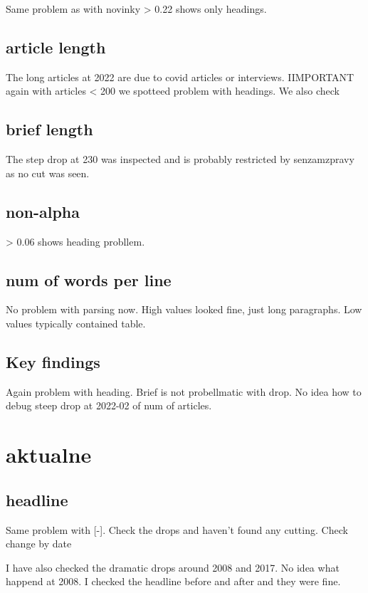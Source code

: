 \documentclass{article}
\begin{document}
        Same problem as with novinky > 0.22 shows only headings.

    \subsection{article length}
    The long articles at 2022 are due to covid articles or interviews.
    IIMPORTANT again with articles < 200 we spotteed problem with headings.
    We also check 

    \subsection{brief length}
    The step drop at 230 was inspected and is probably restricted by senzamzpravy as no cut was seen.


    \subsection{non-alpha}
    > 0.06 shows heading probllem.

    \subsection{num of words per line}
    No problem with parsing now. High values looked fine, just long paragraphs.
    Low values typically contained table.

    \subsection{Key findings}
    Again problem with heading. Brief is not probellmatic with drop.
    No idea how to debug steep drop at 2022-02 of num of articles.



    \section{aktualne}
    \subsection{headline}
     Same problem with [-]. Check the drops and haven't found any cutting.
     Check change by date 

     I have also checked the dramatic drops around 2008 and 2017.
     No idea what happend at 2008. I checked the headline before and after and they were fine.
\end{document}
